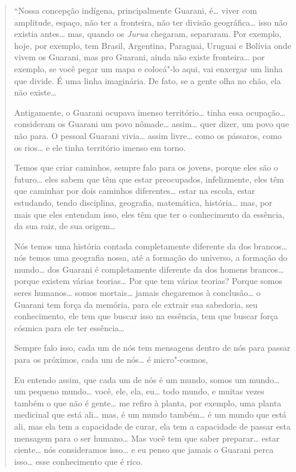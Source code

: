 \begin{quote}
``Nossa concepção indígena, principalmente Guarani, é… viver com
amplitude, espaço, não ter a fronteira, não ter divisão
geográfica… isso não existia antes… mas, quando os
\emph{Jurua} chegaram, separaram. Por exemplo, hoje, por exemplo, tem
Brasil, Argentina, Paraguai, Uruguai e Bolívia onde vivem os Guarani,
mas pro Guarani, ainda não existe fronteira… por exemplo, se você
pegar um mapa e colocá"-lo aqui, vai enxergar um linha que divide. É uma
linha imaginária. De fato, se a gente olha no chão, ela não
existe…

Antigamente, o Guarani ocupava imenso território… tinha essa
ocupação… consideram os Guarani um povo nômade…
assim… quer dizer, um povo que não para. O pessoal Guarani
vivia… assim livre… como os pássaros, como os rios…
e ele tinha território imenso em torno.

Temos que criar caminhos, sempre falo para os jovens, porque eles são o
futuro… eles sabem que têm que estar preocupados, infelizmente,
eles têm que caminhar por dois caminhos diferentes… estar na
escola, estar estudando, tendo disciplina, geografia, matemática,
história… mas, por mais que eles entendam isso, eles têm que ter
o conhecimento da essência, da sua raiz, de sua origem…

Nós temos uma história contada completamente diferente da dos
brancos… nós temos uma geografia nossa, até a formação do
universo, a formação do mundo… dos Guarani é completamente
diferente da dos homens brancos… porque existem várias
teorias… Por que tem várias teorias? Porque somos seres
humanos… somos mortais… jamais chegaremos à
conclusão… o Guarani tem força da memória, para ele extrair sua
sabedoria, seu conhecimento, ele tem que buscar isso na essência, tem
que buscar força cósmica para ele ter essência…

Sempre falo isso, cada um de nós tem mensagens dentro de nós para passar
para os próximos, cada um de nós… é micro"-cosmos,

Eu entendo assim, que cada um de nós é um mundo, somos um mundo…
um pequeno mundo… você, ele, ela, eu… todo mundo, e muitas
vezes também o que não é gente… me refiro à planta, por exemplo,
uma planta medicinal que está ali… mas, é um mundo também…
é um mundo que está ali, mas ela tem a capacidade de curar, ela tem a
capacidade de passar esta mensagem para o ser humano… Mas você
tem que saber preparar… estar ciente… nós consideramos
isso… e eu penso que jamais o Guarani perca isso… esse
conhecimento que é rico.


\end{quote}
